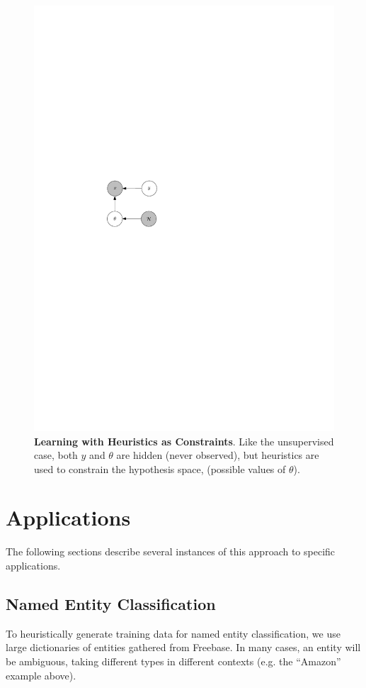 \documentclass[12pt]{article}
\begin{document}
\begin{figure}
  \centering
  \includegraphics{dlvm_train.pdf}
  \caption{{\bf Learning with Heuristics as Constraints}.  Like the unsupervised case, both $y$ and $\theta$ are hidden (never observed),
  but heuristics are used to constrain the hypothesis space, (possible values of $\theta$).}
  \label{dlvm_train}
\end{figure}


\section{Applications}
The following sections describe several instances of this approach to specific applications.

\subsection{Named Entity Classification \citep{Ritter11}}
To heuristically generate training data for named entity classification, we use large dictionaries of entities gathered
from Freebase.  In many cases, an entity will be ambiguous, taking different types in different contexts (e.g. the ``Amazon'' example above).
\end{document}
